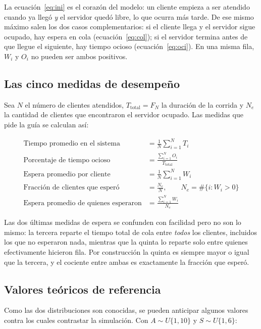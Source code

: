 \documentclass[11pt,letterpaper]{article}
\begin{document}
La ecuación~\eqref{eq:ini} es el corazón del modelo: un cliente empieza a ser atendido cuando ya llegó \emph{y} el servidor quedó libre, lo que ocurra más tarde. De ese mismo máximo salen los dos casos complementarios: si el cliente llega y el servidor sigue ocupado, hay espera en cola (ecuación~\eqref{eq:col}); si el servidor termina antes de que llegue el siguiente, hay tiempo ocioso (ecuación~\eqref{eq:oci}). En una misma fila, $W_i$ y $O_i$ no pueden ser ambos positivos.

\subsection{Las cinco medidas de desempeño}

Sea $N$ el número de clientes atendidos, $T_{\text{total}} = F_N$ la duración de la corrida y $N_e$ la cantidad de clientes que encontraron el servidor ocupado. Las medidas que pide la guía se calculan así:

\begin{align}
\text{Tiempo promedio en el sistema} &= \frac{1}{N}\sum_{i=1}^{N} T_i \\[2pt]
\text{Porcentaje de tiempo ocioso} &= \frac{\sum_{i=1}^{N} O_i}{T_{\text{total}}} \\[2pt]
\text{Espera promedio por cliente} &= \frac{1}{N}\sum_{i=1}^{N} W_i \\[2pt]
\text{Fracción de clientes que esperó} &= \frac{N_e}{N}, \qquad N_e = \#\{i : W_i > 0\} \\[2pt]
\text{Espera promedio de quienes esperaron} &= \frac{\sum_{i=1}^{N} W_i}{N_e}
\end{align}

Las dos últimas medidas de espera se confunden con facilidad pero no son lo mismo: la tercera reparte el tiempo total de cola entre \emph{todos} los clientes, incluidos los que no esperaron nada, mientras que la quinta lo reparte solo entre quienes efectivamente hicieron fila. Por construcción la quinta es siempre mayor o igual que la tercera, y el cociente entre ambas es exactamente la fracción que esperó.

\subsection{Valores teóricos de referencia}

Como las dos distribuciones son conocidas, se pueden anticipar algunos valores contra los cuales contrastar la simulación. Con $A \sim U\{1,10\}$ y $S \sim U\{1,6\}$:
\end{document}
